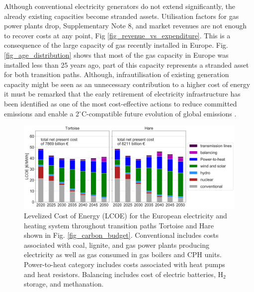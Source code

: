 \documentclass[5p]{elsarticle} %
\begin{document}
Although conventional electricity generators do not extend significantly, the already existing capacities become stranded assets. Utilisation factors for gas power plants drop, Supplementary Note 8, and market revenues are not enough to recover costs at any point, Fig \ref{fig_revenue_vs_expenditure}. This is a consequence of the large capacity of gas recently installed in Europe. Fig. \ref{fig_age_distribution} shows that most of the gas capacity in Europe was installed less than 25 years ago, part of this capacity represents a stranded asset for both transition paths. Although, infrautilisation of existing generation capacity might be seen as an unnecessary contribution to a higher cost of energy it must be remarked that the early retirement of electricity infrastructure has been identified as one of the most cost-effective actions to reduce committed emissions and enable a 2$^{\circ}$C-compatible future evolution of global emissions \cite{Tong_2019}.


\begin{figure}[!h]
\centering
\includegraphics[width=14cm]{figures/LCOE_Base.png}
\caption{Levelized Cost of Energy (LCOE) for the European electricity and heating system throughout transition paths Tortoise and Hare shown in Fig. \ref{fig_carbon_budget}. Conventional includes costs associated with coal, lignite, and gas power plants producing electricity as well as gas consumed in gas boilers and CPH units. Power-to-heat category includes costs associated with heat pumps and heat resistors. Balancing includes cost of electric batteries, H$_2$ storage, and methanation. } \label{fig_system_cost} 
\end{figure}
\end{document}
